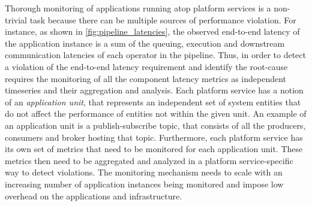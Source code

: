 \par Thorough monitoring of applications running atop platform services is a non-trivial task because there can be multiple sources of performance violation. For instance, as shown in \cref{fig:pipeline_latencies}, the observed end-to-end latency of the application instance is a sum of the queuing, execution and downstream communication latencies of each operator in the pipeline.  Thus, in order to detect a violation of the end-to-end latency requirement and identify the root-cause requires the monitoring of all the component latency metrics as independent timeseries and their aggregation and analysis. Each platform service has a notion of an \textit{application unit}, that represents an independent set of system entities that do not affect the performance of entities not within the given unit. An example of an application unit is a publish-subscribe topic, that consists of all the producers, consumers and broker hosting that topic. Furthermore, each platform service has its own set of metrics that need to be monitored for each application unit. These metrics then need to be aggregated and analyzed in a platform service-specific way to detect violations. The monitoring mechanism needs to scale with an increasing number of application instances being monitored and impose low overhead on the applications and infrastructure.

